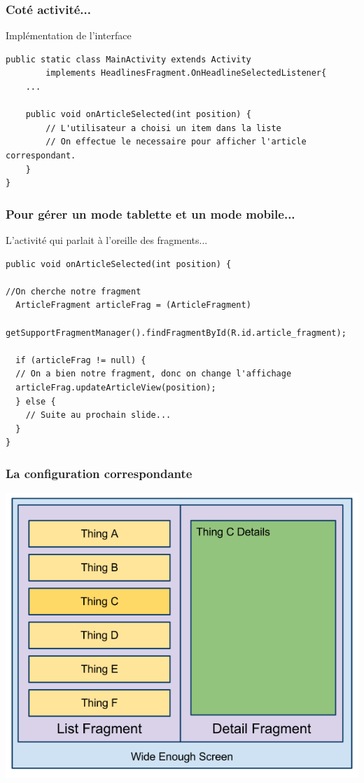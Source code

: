 \documentclass{beamer}
\begin{document}
\begin{frame}[fragile]
\frametitle{Coté activité...}
\begin{block}{Implémentation de l'interface}
\begin{lstlisting}
public static class MainActivity extends Activity
        implements HeadlinesFragment.OnHeadlineSelectedListener{
    ...
    
    public void onArticleSelected(int position) {
        // L'utilisateur a choisi un item dans la liste
        // On effectue le necessaire pour afficher l'article correspondant.
    }
}
\end{lstlisting}

\end{block}
\end{frame}

\begin{frame}[fragile]
\frametitle{Pour gérer un mode tablette et un mode mobile...}
\begin{block}{L'activité qui parlait à l'oreille des fragments...}
\begin{lstlisting}
public void onArticleSelected(int position) {

//On cherche notre fragment
  ArticleFragment articleFrag = (ArticleFragment)
    getSupportFragmentManager().findFragmentById(R.id.article_fragment);

  if (articleFrag != null) {
  // On a bien notre fragment, donc on change l'affichage
  articleFrag.updateArticleView(position);
  } else {
    // Suite au prochain slide...
  }
}
\end{lstlisting}
\end{block}
\end{frame}

\begin{frame}
\frametitle{La configuration correspondante}
\begin{center}
\includegraphics[scale=0.3]{fragments_duo.png}
\end{center}
\end{frame}
\end{document}
